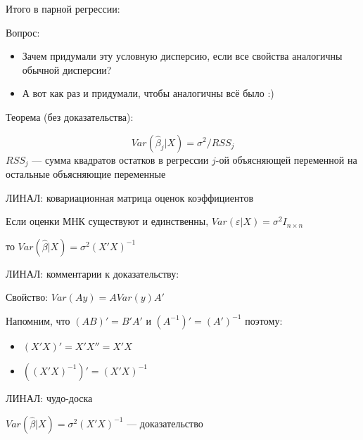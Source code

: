 \documentclass[ignorenonframetext,]{beamer}
\begin{document}
\begin{frame}{Итого в парной регрессии:}

\end{frame}

\begin{frame}{Вопрос:}

\begin{itemize}
\item
  Зачем придумали эту условную дисперсию, если все свойства аналогичны
  обычной дисперсии?
\item
  А вот как раз и придумали, чтобы аналогичны всё было :)
\end{itemize}

\end{frame}

\begin{frame}{Теорема (без доказательства):}

\[
Var(\hat{\beta}_j| X)=\sigma^2/RSS_j
\] $RSS_j$ --- сумма квадратов остатков в регрессии $j$-ой объясняющей
переменной на остальные объясняющие переменные

\end{frame}

\begin{frame}{ЛИНАЛ: ковариационная матрица оценок коэффициентов}

Если оценки МНК существуют и единственны,
$Var(\varepsilon|X)=\sigma^2 I_{n\times n}$

то $Var(\hat{\beta}|X)=\sigma^2 (X'X)^{-1}$

\end{frame}

\begin{frame}{ЛИНАЛ: комментарии к доказательству:}

Свойство: $Var(Ay)=AVar(y)A'$

Напомним, что $(AB)'=B'A'$ и $(A^{-1})'=(A')^{-1}$ поэтому:

\begin{itemize}
\item
  $(X'X)'=X'X''=X'X$
\item
  $((X'X)^{-1})'=(X'X)^{-1}$
\end{itemize}

\end{frame}

\begin{frame}{ЛИНАЛ: чудо-доска}

$Var(\hat{\beta}|X)=\sigma^2 (X'X)^{-1}$ --- доказательство

\end{frame}
\end{document}
